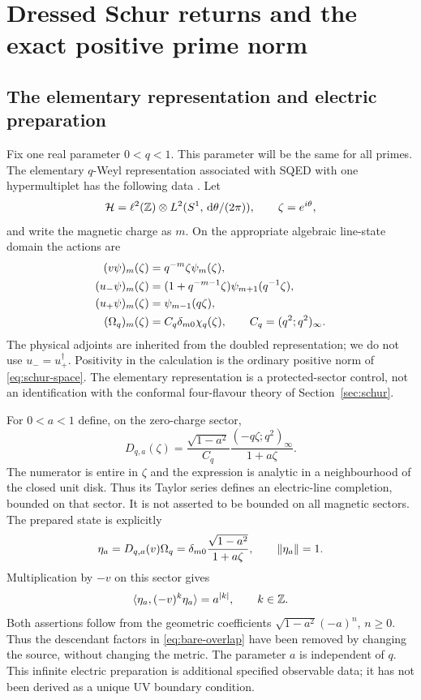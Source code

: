 \clearpage
\section{Dressed Schur returns and the exact positive prime norm}
\label{sec:dressed}
\subsection{The elementary representation and electric preparation}
Fix one real parameter $0<q<1$. This parameter will be the same for
all primes. The elementary $q$-Weyl representation associated with
SQED with one hypermultiplet has the following data
\cite[Section 3.1.1]{RG}. Let
\begin{equation}\label{eq:schur-space}
 \mathcal H=\ell^2(\mathbb Z)\otimes L^2(S^1,\,\mathrm d\theta/(2\pi)),
 \qquad \zeta=e^{i\theta},
\end{equation}
and write the magnetic charge as $m$. On the appropriate algebraic
line-state domain the actions are
\begin{align}
 (v\psi)_m(\zeta)&=q^{-m}\zeta\psi_m(\zeta),\notag\\
 (u_-\psi)_m(\zeta)&=(1+q^{-m-1}\zeta)\psi_{m+1}(q^{-1}\zeta),
 \notag\\
 (u_+\psi)_m(\zeta)&=\psi_{m-1}(q\zeta),\notag\\
 (\Omega_q)_m(\zeta)&=C_q\delta_{m0}\chi_q(\zeta),
 \qquad C_q=(q^2;q^2)_\infty.
 \label{eq:schur-actions}
\end{align}
The physical adjoints are inherited from the doubled representation;
we do not use $u_-=u_+^\dagger$. Positivity in the calculation is
the ordinary positive norm of \eqref{eq:schur-space}.
The elementary representation is a protected-sector control, not an
identification with the conformal four-flavour theory of
Section~\ref{sec:schur}.

For $0<a<1$ define, on the zero-charge sector,
\begin{equation}\label{eq:dressing}
 D_{q,a}(\zeta)=\frac{\sqrt{1-a^2}}{C_q}
 \frac{(-q\zeta;q^2)_\infty}{1+a\zeta}.
\end{equation}
The numerator is entire in $\zeta$ and the expression is analytic in
a neighbourhood of the closed unit disk. Thus its Taylor series
defines an electric-line completion, bounded on that sector.
It is not asserted to be bounded on all magnetic sectors. The prepared
state is explicitly
\begin{equation}\label{eq:eta}
 \eta_a=D_{q,a}(v)\Omega_q
 =\delta_{m0}\frac{\sqrt{1-a^2}}{1+a\zeta},\qquad
 \lVert \eta_a\rVert=1.
\end{equation}
Multiplication by $-v$ on this sector gives
\begin{equation}\label{eq:eta-returns}
 \langle \eta_a,(-v)^k\eta_a\rangle=a^{|k|},\qquad k\in\mathbb Z.
\end{equation}
Both assertions follow from the geometric coefficients
$\sqrt{1-a^2}(-a)^n$, $n\geq0$. Thus the descendant factors in
\eqref{eq:bare-overlap} have been removed by changing the source,
without changing the metric. The parameter $a$ is independent of $q$.
This infinite electric preparation is additional specified observable
data; it has not been derived as a unique UV boundary condition.

